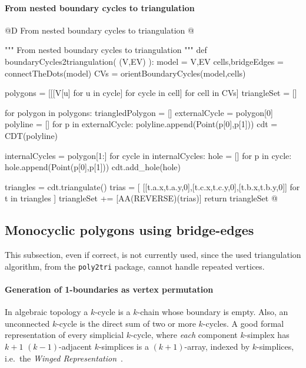 \documentclass[11pt,oneside]{article}    %
\begin{document}
\paragraph{From nested boundary cycles to triangulation}
@D From nested boundary cycles to triangulation 
@{""" From nested boundary cycles to triangulation """
def boundaryCycles2triangulation( (V,EV) ):
    model = V,EV
    cells,bridgeEdges = connectTheDots(model)
    CVs = orientBoundaryCycles(model,cells)
    
    polygons = [[[V[u] for u in cycle] for cycle in cell] for cell in CVs]
    triangleSet = []   
    
    for polygon in polygons:
        triangledPolygon = []
        externalCycle = polygon[0]
        polyline = []
        for p in externalCycle:
            polyline.append(Point(p[0],p[1]))
        cdt = CDT(polyline)
        
        internalCycles = polygon[1:]
        for cycle in internalCycles:
            hole = []
            for p in cycle:
                hole.append(Point(p[0],p[1]))
            cdt.add_hole(hole)
            
        triangles = cdt.triangulate()
        trias = [ [[t.a.x,t.a.y,0],[t.c.x,t.c.y,0],[t.b.x,t.b.y,0]] for t in triangles ]
        triangleSet += [AA(REVERSE)(trias)]
    return triangleSet
@}


\subsection{Monocyclic polygons using bridge-edges}

This subsection, even if correct, is not currently used, since the used triangulation algorithm, from the \texttt{poly2tri} package, cannot handle repeated vertices.

\paragraph{Generation of 1-boundaries as vertex permutation}
In algebraic topology a $k$-cycle is a $k$-chain whose boundary is empty. Also, an unconnected $k$-cycle is the direct sum of two or more $k$-cycles. A good formal representation of every simplicial $k$-cycle, where \emph{each} component $k$-simplex has $k+1$ $(k-1)$-adjacent $k$-simplices is a $(k+1)$-array, indexed by $k$-simplices, i.e.~the \emph{Winged Representation}~\cite{Paoluzzi:1993:DMS:169728.169719}. 
\end{document}
